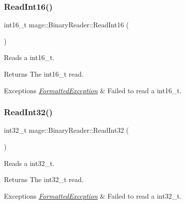 \subsubsection{\texorpdfstring{Read\+Int16()}{ReadInt16()}}
{\footnotesize\ttfamily int16\+\_\+t mage\+::\+Binary\+Reader\+::\+Read\+Int16 (\begin{DoxyParamCaption}{ }\end{DoxyParamCaption})\hspace{0.3cm}{\ttfamily [protected]}}

Reads a {\ttfamily int16\+\_\+t}.

\begin{DoxyReturn}{Returns}
The {\ttfamily int16\+\_\+t} read. 
\end{DoxyReturn}

\begin{DoxyExceptions}{Exceptions}
{\em \hyperlink{structmage_1_1_formatted_exception}{Formatted\+Exception}} & Failed to read a {\ttfamily int16\+\_\+t}. \\
\hline
\end{DoxyExceptions}
\hypertarget{classmage_1_1_binary_reader_a8a463e4e5469e90246a40f2898abbc67}{}\label{classmage_1_1_binary_reader_a8a463e4e5469e90246a40f2898abbc67} 
\subsubsection{\texorpdfstring{Read\+Int32()}{ReadInt32()}}
{\footnotesize\ttfamily int32\+\_\+t mage\+::\+Binary\+Reader\+::\+Read\+Int32 (\begin{DoxyParamCaption}{ }\end{DoxyParamCaption})\hspace{0.3cm}{\ttfamily [protected]}}

Reads a {\ttfamily int32\+\_\+t}.

\begin{DoxyReturn}{Returns}
The {\ttfamily int32\+\_\+t} read. 
\end{DoxyReturn}

\begin{DoxyExceptions}{Exceptions}
{\em \hyperlink{structmage_1_1_formatted_exception}{Formatted\+Exception}} & Failed to read a {\ttfamily int32\+\_\+t}. \\
\hline
\end{DoxyExceptions}
\hypertarget{classmage_1_1_binary_reader_a404b0bdd39f4f1cd52cb8360896ac851}{}\label{classmage_1_1_binary_reader_a404b0bdd39f4f1cd52cb8360896ac851} 

